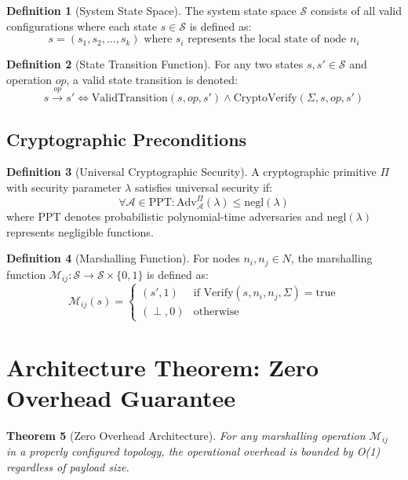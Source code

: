 \documentclass[11pt,a4paper]{article}
\newtheorem{theorem}{Theorem}[section]
\theoremstyle{definition}
\newtheorem{definition}[theorem]{Definition}
\theoremstyle{remark}
\newcommand{\M}{\mathcal{M}}
\renewcommand{\S}{\mathcal{S}}
\newcommand{\Adv}{\text{Adv}}
\newcommand{\negl}{\text{negl}}
\begin{document}
\begin{definition}[System State Space]
The system state space $\S$ consists of all valid configurations where each state $s \in \S$ is defined as:
$$s = (s_1, s_2, \ldots, s_k) \text{ where } s_i \text{ represents the local state of node } n_i$$
\end{definition}

\begin{definition}[State Transition Function]
For any two states $s, s' \in \S$ and operation $op$, a valid state transition is denoted:
$$s \xrightarrow{op} s' \Leftrightarrow \text{ValidTransition}(s, op, s') \land \text{CryptoVerify}(\Sigma, s, op, s')$$
\end{definition}

\subsection{Cryptographic Preconditions}

\begin{definition}[Universal Cryptographic Security]
A cryptographic primitive $\Pi$ with security parameter $\lambda$ satisfies universal security if:
$$\forall \mathcal{A} \in \text{PPT} : \Adv^{\Pi}_{\mathcal{A}}(\lambda) \leq \negl(\lambda)$$
where PPT denotes probabilistic polynomial-time adversaries and $\negl(\lambda)$ represents negligible functions.
\end{definition}

\begin{definition}[Marshalling Function]
For nodes $n_i, n_j \in N$, the marshalling function $\M_{ij}: \S \rightarrow \S \times \{0,1\}$ is defined as:
$$\M_{ij}(s) = \begin{cases}
(s', 1) & \text{if } \text{Verify}(s, n_i, n_j, \Sigma) = \text{true} \\
(\perp, 0) & \text{otherwise}
\end{cases}$$
\end{definition}

\section{Architecture Theorem: Zero Overhead Guarantee}

\begin{theorem}[Zero Overhead Architecture]
For any marshalling operation $\M_{ij}$ in a properly configured topology, the operational overhead is bounded by O(1) regardless of payload size.
\end{theorem}
\end{document}
